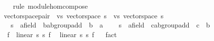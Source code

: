\begin{isabellebody}
\ \ \isamarkupfalse%
\ {\isacharparenleft}{\kern0pt}rule\ module{\isacharunderscore}{\kern0pt}hom{\isacharunderscore}{\kern0pt}compose{\isacharparenright}{\kern0pt}%
\endisatagproof
{\isafoldproof}%
%
\isadelimproof
\isanewline
%
\endisadelimproof
{}\isamarkupfalse%
\isanewline
\isanewline
{}\isamarkupfalse%
\ vector{\isacharunderscore}{\kern0pt}space{\isacharunderscore}{\kern0pt}pair\ {\isacharequal}{\kern0pt}\ vs{}{\isacharcolon}{\kern0pt}\ vector{\isacharunderscore}{\kern0pt}space\ s{}\ {\isacharplus}{\kern0pt}\ vs{}{\isacharcolon}{\kern0pt}\ vector{\isacharunderscore}{\kern0pt}space\ s{}\isanewline
\ \ \ s{}\ {\isacharcolon}{\kern0pt}{\isacharcolon}{\kern0pt}\ {\isachardoublequoteopen}{\isacharprime}{\kern0pt}a{\isacharcolon}{\kern0pt}{\isacharcolon}{\kern0pt}field\ {\isasymRightarrow}\ {\isacharprime}{\kern0pt}b{\isacharcolon}{\kern0pt}{\isacharcolon}{\kern0pt}ab{\isacharunderscore}{\kern0pt}group{\isacharunderscore}{\kern0pt}add\ {\isasymRightarrow}\ {\isacharprime}{\kern0pt}b{\isachardoublequoteclose}\ {\isacharparenleft}{\kern0pt}\ {\isachardoublequoteopen}{\isacharasterisk}{\kern0pt}a{\isachardoublequoteclose}\ {}{}{\isacharparenright}{\kern0pt}\isanewline
\ \ \ s{}\ {\isacharcolon}{\kern0pt}{\isacharcolon}{\kern0pt}\ {\isachardoublequoteopen}{\isacharprime}{\kern0pt}a{\isacharcolon}{\kern0pt}{\isacharcolon}{\kern0pt}field\ {\isasymRightarrow}\ {\isacharprime}{\kern0pt}c{\isacharcolon}{\kern0pt}{\isacharcolon}{\kern0pt}ab{\isacharunderscore}{\kern0pt}group{\isacharunderscore}{\kern0pt}add\ {\isasymRightarrow}\ {\isacharprime}{\kern0pt}c{\isachardoublequoteclose}\ {\isacharparenleft}{\kern0pt}\ {\isachardoublequoteopen}{\isacharasterisk}{\kern0pt}b{\isachardoublequoteclose}\ {}{}{\isacharparenright}{\kern0pt}\isanewline
{}\isanewline
\isanewline
{}\isamarkupfalse%
\ \ f\ \ {\isachardoublequoteopen}linear\ s{}\ s{}\ f{\isachardoublequoteclose}\ \isanewline
{}\isamarkupfalse%
\ linear\ s{}\ s{}\ f%
\isadelimproof
\ %
\endisadelimproof
%
\isatagproof
{}\isamarkupfalse%
\ fact%
\endisatagproof
{\isafoldproof}%
%
\isadelimproof
%
\endisadelimproof
\isanewline
{}\isamarkupfalse%
%
\end{isabellebody}
